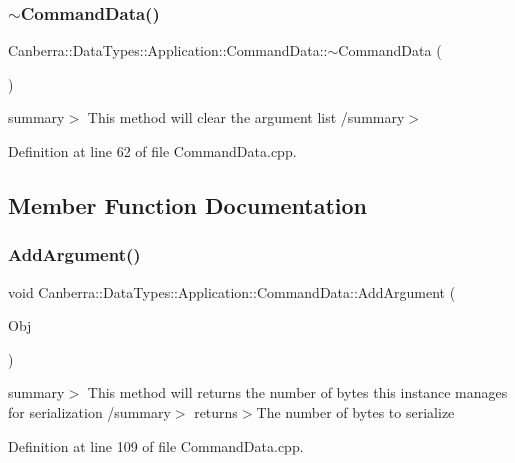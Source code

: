 \subsubsection{\texorpdfstring{$\sim$\+Command\+Data()}{~CommandData()}}
{\footnotesize\ttfamily Canberra\+::\+Data\+Types\+::\+Application\+::\+Command\+Data\+::$\sim$\+Command\+Data (\begin{DoxyParamCaption}\item[{void}]{ }\end{DoxyParamCaption})\hspace{0.3cm}{\ttfamily [virtual]}}

summary$>$ This method will clear the argument list /summary$>$ 

Definition at line 62 of file Command\+Data.\+cpp.



\subsection{Member Function Documentation}
\mbox{\label{class_canberra_1_1_data_types_1_1_application_1_1_command_data_afeb9d2d16aafbfef549d7974242425cc_afeb9d2d16aafbfef549d7974242425cc}} 
\subsubsection{\texorpdfstring{Add\+Argument()}{AddArgument()}}
{\footnotesize\ttfamily void Canberra\+::\+Data\+Types\+::\+Application\+::\+Command\+Data\+::\+Add\+Argument (\begin{DoxyParamCaption}\item[{\hyperlink{class_canberra_1_1_serialization_1_1_serializable_object}{Canberra\+::\+Serialization\+::\+Serializable\+Object} $\ast$}]{Obj }\end{DoxyParamCaption})}

summary$>$ This method will returns the number of bytes this instance manages for serialization /summary$>$ returns$>$The number of bytes to serialize

Definition at line 109 of file Command\+Data.\+cpp.

